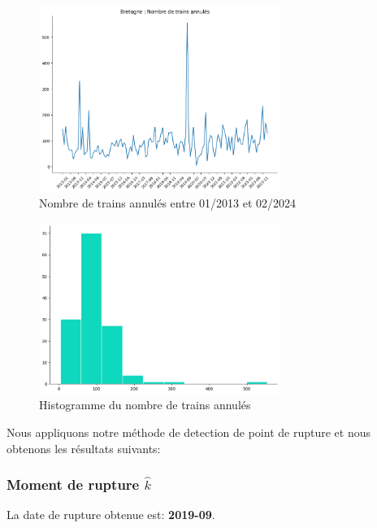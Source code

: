 {\begin{figure}[H]
  \centering
  \includegraphics[width=0.7\textwidth]{image/BR-FIG07.png}
  \caption{Nombre de trains annulés entre 01/2013 et 02/2024}
\end{figure}

\begin{figure}[H]
  \centering
  \includegraphics[width=0.7\textwidth]{image/BR-FOG08.png}
  \caption{Histogramme du nombre de trains annulés}
\end{figure}

Nous appliquons notre méthode de detection de point de rupture et nous obtenons les résultats suivants:

\subsubsection{Moment de rupture $\hat{k}$}

La date de rupture obtenue est: \textbf{2019-09}. 


}
